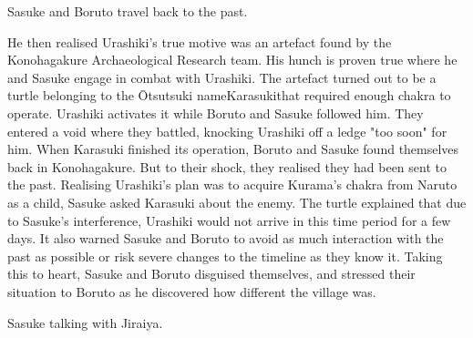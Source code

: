 \documentclass[a4paper,12pt]{article}
\begin{document}
Sasuke and Boruto travel back to the past.\\ \par \vspace{0.5cm}

He then realised Urashiki's true motive was an artefact found by the Konohagakure Archaeological Research team. His hunch is proven true where he and Sasuke engage in combat with Urashiki. The artefact turned out to be a turtle belonging to the Ōtsutsuki nameKarasukithat required enough chakra to operate. Urashiki activates it while Boruto and Sasuke followed him. They entered a void where they battled, knocking Urashiki off a ledge "too soon" for him. When Karasuki finished its operation, Boruto and Sasuke found themselves back in Konohagakure. But to their shock, they realised they had been sent to the past. Realising Urashiki's plan was to acquire Kurama's chakra from Naruto as a child, Sasuke asked Karasuki about the enemy. The turtle explained that due to Sasuke's interference, Urashiki would not arrive in this time period for a few days. It also warned Sasuke and Boruto to avoid as much interaction with the past as possible or risk severe changes to the timeline as they know it. Taking this to heart, Sasuke and Boruto disguised themselves, and stressed their situation to Boruto as he discovered how different the village was.\\ \par \vspace{0.5cm}

Sasuke talking with Jiraiya.\\ \par \vspace{0.5cm}
\end{document}
